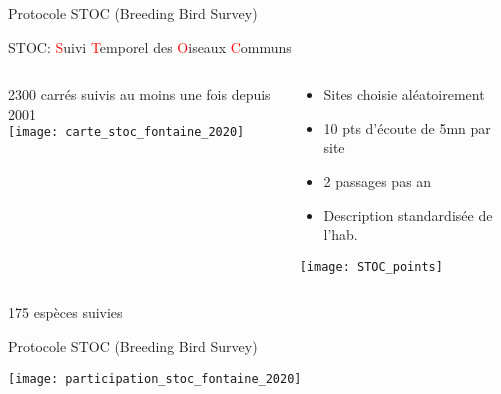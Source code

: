 \documentclass[10pt]{beamer}
\begin{document}
\begin{frame}{Protocole STOC (Breeding Bird Survey)}
    \begin{center}
      STOC: \textcolor{red}{S}uivi \textcolor{red}{T}emporel des \textcolor{red}{O}iseaux \textcolor{red}{C}ommuns
  \end{center}
 \begin{columns}[c]
    \begin{column}[c]{0.5\textwidth}
      \begin{center}
      2300 carrés suivis au moins une fois depuis 2001 \\
    \texttt{[image: carte\_stoc\_fontaine\_2020]}
      \end{center}
    \end{column}
    \begin{column}[c]{0.5\textwidth}
    \begin{small}
      \begin{itemize}
      \item  Sites choisie aléatoirement
    \item 10 pts d'écoute de 5mn par site
    \item 2 passages pas an
    \item Description standardisée de l'hab.
    \end{itemize}
    \end{small}
     \begin{center}
       \texttt{[image: STOC\_points]}
  \end{center}
    \end{column}
  \end{columns}
 \begin{center}
  175 espèces suivies
  \end{center}
  \begin{tiny}
  \cite{Fontaine2020}
  \end{tiny}

\end{frame}


\begin{frame}{Protocole STOC (Breeding Bird Survey)}
    \begin{center}
        \texttt{[image: participation\_stoc\_fontaine\_2020]}
  \end{center}
   \begin{tiny}
  \cite{Fontaine2020}
  \end{tiny}

\end{frame}
\end{document}
